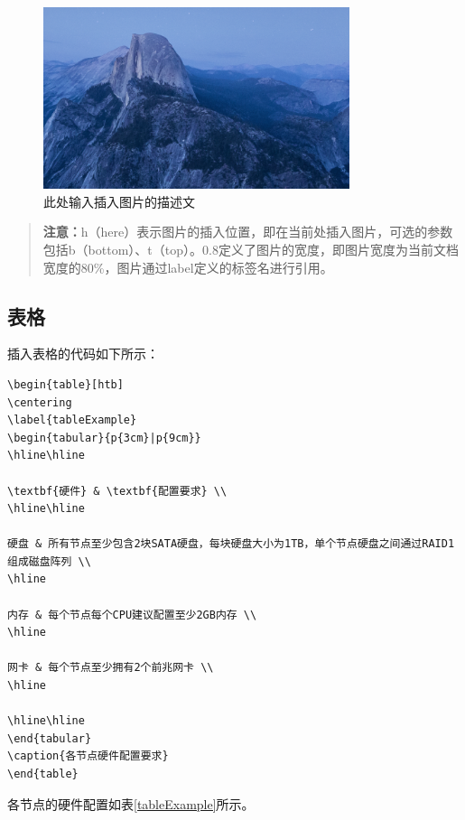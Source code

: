 \begin{figure}[h]
    \centering
    \label{example}
    \includegraphics[width=0.8\textwidth]{pic/example.png}
    \caption{此处输入插入图片的描述文}
\end{figure}

\begin{quote}
\kaishu
\textbf{注意：}h（here）表示图片的插入位置，即在当前处插入图片，可选的参数包括b（bottom）、t（top）。0.8定义了图片的宽度，即图片宽度为当前文档宽度的80\%，图片通过label定义的标签名进行引用。
\end{quote}

\subsection{表格}
插入表格的代码如下所示：

\begin{Verbatim}[]
\begin{table}[htb]
\centering
\label{tableExample}
\begin{tabular}{p{3cm}|p{9cm}}
\hline\hline

\textbf{硬件} & \textbf{配置要求} \\
\hline\hline

硬盘 & 所有节点至少包含2块SATA硬盘，每块硬盘大小为1TB，单个节点硬盘之间通过RAID1组成磁盘阵列 \\
\hline

内存 & 每个节点每个CPU建议配置至少2GB内存 \\
\hline

网卡 & 每个节点至少拥有2个前兆网卡 \\
\hline

\hline\hline
\end{tabular}
\caption{各节点硬件配置要求}
\end{table}
\end{Verbatim}


各节点的硬件配置如表\ref{tableExample}所示。

